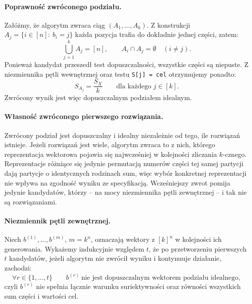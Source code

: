 \documentclass[11pt]{article}
\begin{document}
\paragraph{Poprawność zwróconego podziału.}

Załóżmy, że algorytm zwraca ciąg \((A_1,\ldots,A_k)\). Z konstrukcji \(A_j=\{i\in[n]:\ b_i=j\}\) każda pozycja trafia do dokładnie jednej części, zatem:
\begin{equation}
\bigcup_{j=1}^{k}A_j=[n], \qquad A_i\cap A_j=\emptyset\quad(i\neq j).
\end{equation}
Ponieważ kandydat przeszedł test dopuszczalności, wszystkie części są niepuste. Z niezmiennika pętli wewnętrznej oraz testu \texttt{S[j] = cel} otrzymujemy ponadto:
\begin{equation}
S_{A_j}=\frac{S_X}{k} \qquad\text{dla każdego }j\in[k].
\end{equation}
Zwrócony wynik jest więc dopuszczalnym podziałem idealnym.

\paragraph{Własność zwróconego pierwszego rozwiązania.}

Zwrócony podział jest dopuszczalny i idealny niezależnie od tego, ile rozwiązań istnieje. Jeżeli rozwiązań jest wiele, algorytm zwraca to z nich, którego reprezentacja wektorowa pojawia się najwcześniej w kolejności zliczania \(k\)-cznego. Reprezentacje różniące się jedynie permutacją numerów części tej samej partycji dają partycje o identycznych rodzinach sum, więc wybór konkretnej reprezentacji nie wpływa na zgodność wyniku ze specyfikacją. Wcześniejszy zwrot pomija jedynie kandydatów, którzy -- na mocy niezmiennika pętli zewnętrznej -- i tak nie są rozwiązaniami.

\paragraph{Niezmiennik pętli zewnętrznej.}

Niech \(b^{(1)},\ldots,b^{(m)}\), \(m=k^n\), oznaczają wektory z \([k]^n\) w kolejności ich generowania. Wykażemy indukcyjnie względem \(t\), że po przetworzeniu pierwszych \(t\) kandydatów, jeżeli algorytm nie zwrócił wyniku i kontynuuje działanie, zachodzi:
\begin{equation}
\forall r\in\{1,\ldots,t\}\qquad b^{(r)}\ \text{nie jest dopuszczalnym wektorem podziału idealnego},
\end{equation}
czyli \(b^{(r)}\) nie spełnia łącznie warunku suriektywności oraz równości wszystkich sum części i wartości \(\mathrm{cel}\).
\end{document}
